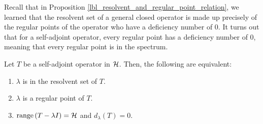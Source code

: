 Recall that in Proposition \eqref{lbl_resolvent_and_regular_point_relation}, we learned that the resolvent set of a general closed operator is made up precisely of the regular points of the operator who have a deficiency number of 0. It turns out that for a self-adjoint operator, every regular point has a deficiency number of 0, meaning that every regular point is in the spectrum.

\begin{corollary}\label{lbl_corollary_sa_op_and_regular_points}
  Let $T$ be a self-adjoint operator in $\mathcal{H}$. Then, the following are equivalent:
  \begin{enumerate}[label = (\alph*)]
    \item $\lambda$ is in the resolvent set of $T$.
    \item $\lambda$ is a regular point of $T$.
    \item $\operatorname{range}\left(T - \lambda I\right) = \mathcal{H}$ and $d_\lambda (T) = 0$.
  \end{enumerate}
\end{corollary}

